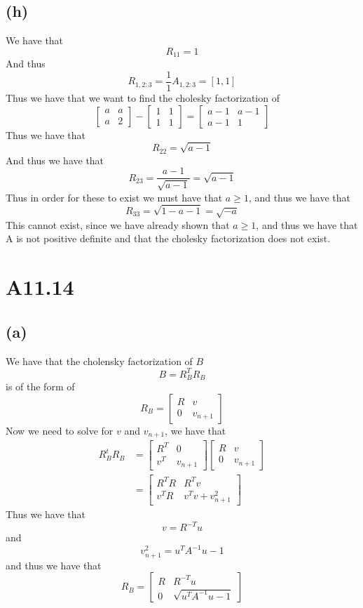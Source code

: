 \subsection*{(h)}
We have that 
$$R_11=1$$
And thus
$$R_{1,2:3}=\frac{1}{1}A_{1,2:3}=[1,1]$$
Thus we have that we want to find the cholesky factorization of
$$\begin{bmatrix}
    a & a\\
    a & 2
\end{bmatrix}-\begin{bmatrix}
    1 & 1\\
    1 & 1
\end{bmatrix}=\begin{bmatrix}
    a-1 & a-1\\
    a-1 & 1
\end{bmatrix}$$
Thus we have that
$$R_{22}=\sqrt{a-1}$$
And thus we have that
$$R_{23}=\frac{a-1}{\sqrt{a-1}}=\sqrt{a-1}$$
Thus in order for these to exist we must have that $a\geq 1$, and thus we have
that 
$$R_{33}=\sqrt{1-a-1}=\sqrt{-a}$$
This cannot exist, since we have already shown that $a\geq 1$, and thus we have
that A is not positive definite and that the cholesky factorization does not
exist.
\section*{A11.14}
\subsection*{(a)}
We have that the cholensky factorization of $B$
$$B=R_B^T R_B$$
is of the form of  
$$R_B=\begin{bmatrix}
    R & v\\
    0 & v_{n+1}
\end{bmatrix}$$
Now we need to solve for $v$ and $v_{n+1}$, we have that
\begin{align*}
R_B^t R_B&=\begin{bmatrix}
    R^T & 0\\
    v^T & v_{n+1}
\end{bmatrix}\begin{bmatrix}
    R & v\\
    0 & v_{n+1}
\end{bmatrix}\\
&=\begin{bmatrix}
    R^T R & R^Tv\\
    v^TR & v^Tv+v_{n+1}^2
\end{bmatrix}
\end{align*}
Thus we have that 
$$v=R^{-T}u$$
and 
$$v_{n+1}^2=u^TA^{-1}u-1$$
and thus we have that
$$\boxed{
    R_B=\begin{bmatrix}
        R & R^{-T}u\\
        0 & \sqrt{u^TA^{-1}u-1}
    \end{bmatrix}
}$$
